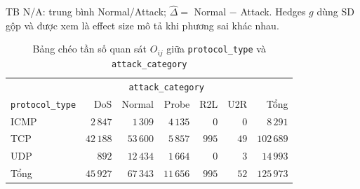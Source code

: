 \documentclass[../main.tex]{subfiles}
\begin{document}
\begin{table}[H]
\centering
\caption{Tổng hợp ba kiểm định Welch hai mẫu độc lập}
\label{tab:t35:summary}
\scriptsize
\setlength{\tabcolsep}{2.5pt}
\par\smallskip
\footnotesize TB N/A: trung bình Normal/Attack; $\widehat\Delta=$ Normal $-$ Attack.
Hedges $g$ dùng SD gộp và được xem là effect size mô tả khi phương sai khác nhau.
\end{table}

\begin{table}[H]
  \centering
  \caption{Bảng chéo tần số quan sát $O_{ij}$ giữa \texttt{protocol\_type} và \texttt{attack\_category}}
  \label{tab:t34:chi2-observed}
  \begin{tabular}{lrrrrrr}
    \toprule
    & \multicolumn{5}{c}{\texttt{attack\_category}} & \\
    \cmidrule(lr){2-6}
    \texttt{protocol\_type} & DoS & Normal & Probe & R2L & U2R & Tổng \\
    \midrule
    ICMP & $2\,847$  & $1\,309$  & $4\,135$ & $0$   & $0$  & $8\,291$ \\
    TCP  & $42\,188$ & $53\,600$ & $5\,857$ & $995$ & $49$ & $102\,689$ \\
    UDP  & $892$     & $12\,434$ & $1\,664$ & $0$   & $3$  & $14\,993$ \\
    \midrule
    Tổng & $45\,927$ & $67\,343$ & $11\,656$ & $995$ & $52$ & $125\,973$ \\
    \bottomrule
  \end{tabular}
\end{table}
\end{document}
